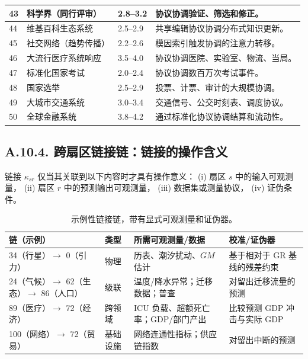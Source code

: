 \documentclass[11pt,a4paper]{article}
\begin{document}
\begin{longtable}{|p{0.8cm}|p{6.2cm}|p{3.0cm}|p{5.7cm}|}
	43 & 科学界（同行评审） & 2.8--3.2 & 协议协调验证、筛选和修正。 \\
	\hline
	44 & 维基百科生态系统 & 2.5--2.9 & 共享编辑协议协调分布式知识更新。 \\
	\hline
	45 & 社交网络（趋势传播） & 2.2--2.6 & 模因索引触发协调的注意力转移。 \\
	\hline
	46 & 大流行医疗系统响应 & 3.5--4.0 & 协议协调医院、实验室、物流、当局。 \\
	\hline
	47 & 标准化国家考试 & 2.0--2.4 & 协议协调数百万次考试事件。 \\
	\hline
	48 & 国家选举 & 2.5--2.9 & 投票、计票、审计的大规模协调。 \\
	\hline
	49 & 大城市交通系统 & 3.0--3.4 & 交通信号、公交时刻表、调度协议。 \\
	\hline
	50 & 全球金融系统 & 3.8--4.2 & 通过标准化协议协调结算和流动性。 \\
	\hline
\end{longtable}
	
	\subsection*{A.10.4. 跨扇区链接链：链接的操作含义}
	
	链接 $\kappa_{sr}$ 仅当其关联到以下内容时才具有操作意义：
	(i) 扇区 $s$ 中的输入可观测量，
	(ii) 扇区 $r$ 中的预测输出可观测量，
	(iii) 数据集或测量协议，
	(iv) 证伪条件。
	
	\begin{table}[htbp]
		\centering
		\small
		\begin{tabular}{p{}p{}p{}p{}}
			\toprule
			\textbf{链（示例）} & \textbf{类型} & \textbf{所需可观测量/数据} & \textbf{校准/证伪器} \\
			\midrule
			34（行星）$\to$ 0（引力） & 物理 & 历表、潮汐扰动、$GM$ 估计 & 基于相对于 GR 基线的残差约束 \\
			24（气候）$\to$ 62（生态）$\to$ 86（人口） & 级联 & 温度/降水异常；迁移数据；普查 & 对留出迁移流量的预测 \\
			89（医疗）$\to$ 72（经济） & 跨领域 & ICU 负载、超额死亡率；GDP/部门产出 & 比较预测 GDP 冲击与实际 GDP \\
			100（网络）$\to$ 72（贸易） & 基础设施 & 网络连通性指标；供应链指数 & 对留出中断的预测 \\
			\bottomrule
		\end{tabular}
		\caption{示例性链接链，带有显式可观测量和证伪器。}
		\label{tab:link-chains-auditable}
	\end{table}
	
\end{document}
